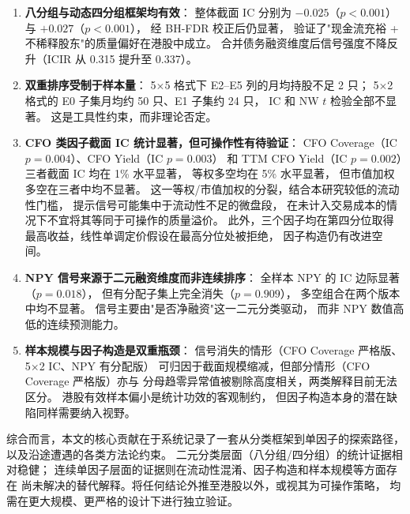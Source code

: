 \documentclass[a4paper,10pt]{article}
\begin{document}
\begin{enumerate}[leftmargin=2em]
    \item \textbf{八分组与动态四分组框架均有效}：
    整体截面 IC 分别为 $-0.025$（$p<0.001$）与 $+0.027$（$p<0.001$），
    经 BH-FDR 校正后仍显著，
    验证了"现金流充裕 + 不稀释股东"的质量偏好在港股中成立。
    合并债务融资维度后信号强度不降反升（ICIR 从 0.315 提升至 0.337）。

    \item \textbf{双重排序受制于样本量}：
    5$\times$5 格式下 E2--E5 列的月均持股不足 2 只；
    5$\times$2 格式的 E0 子集月均约 50 只、E1 子集约 24 只，
    IC 和 NW $t$ 检验全部不显著。
    这是工具性约束，而非理论否定。

    \item \textbf{CFO 类因子截面 IC 统计显著，但可操作性有待验证}：
    CFO Coverage（IC $p=0.004$）、CFO Yield（IC $p=0.003$）
    和 TTM CFO Yield（IC $p=0.002$）三者截面 IC 均在 1\% 水平显著，
    等权多空均在 5\% 水平显著，
    但市值加权多空在三者中均不显著。
    这一等权/市值加权的分裂，结合本研究较低的流动性门槛，
    提示信号可能集中于流动性不足的微盘段，
    在未计入交易成本的情况下不宜将其等同于可操作的质量溢价。
    此外，三个因子均在第四分位取得最高收益，线性单调定价假设在最高分位处被拒绝，
    因子构造仍有改进空间。

    \item \textbf{NPY 信号来源于二元融资维度而非连续排序}：
    全样本 NPY 的 IC 边际显著（$p=0.018$），
    但有分配子集上完全消失（$p=0.909$），
    多空组合在两个版本中均不显著。
    信号主要由"是否净融资"这一二元分类驱动，
    而非 NPY 数值高低的连续预测能力。

    \item \textbf{样本规模与因子构造是双重瓶颈}：
    信号消失的情形（CFO Coverage 严格版、5$\times$2 IC、NPY 有分配版）
    可归因于截面规模缩减，但部分情形（CFO Coverage 严格版）亦与
    分母趋零异常值被剔除高度相关，两类解释目前无法区分。
    港股有效样本偏小是统计功效的客观制约，
    但因子构造本身的潜在缺陷同样需要纳入视野。
\end{enumerate}

综合而言，本文的核心贡献在于系统记录了一套从分类框架到单因子的探索路径，
以及沿途遭遇的各类方法论约束。
二元分类层面（八分组/四分组）的统计证据相对稳健；
连续单因子层面的证据则在流动性混淆、因子构造和样本规模等方面存在
尚未解决的替代解释。将任何结论外推至港股以外，或视其为可操作策略，
均需在更大规模、更严格的设计下进行独立验证。
\end{document}
